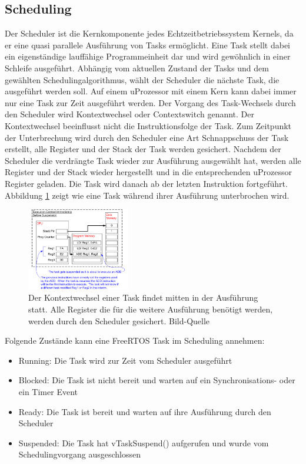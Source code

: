\subsection{Scheduling}
\label{Scheduling}
Der Scheduler ist die Kernkomponente jedes Echtzeitbetriebssystem Kernels, da er eine quasi parallele Aus\-füh\-rung von Tasks ermöglicht. Eine Task stellt dabei ein ei\-gen\-stän\-di\-ge lauffähige Programmeinheit dar und wird ge\-wöhn\-lich in einer Schleife ausgeführt. Abhängig vom aktuellen Zustand der Tasks und dem gewählten Schedulingalgorithmus, wählt der Scheduler die nächste Task, die ausgeführt werden soll. Auf einem uProzessor mit einem Kern kann dabei immer nur eine Task zur Zeit ausgeführt werden. Der Vorgang des Task-Wechsels durch den Scheduler wird Kontextwechsel oder Contextswitch genannt. Der Kontextwechsel beeinflusst nicht die Instruktionsfolge der Task. Zum Zeitpunkt der Unterbrechung wird durch den Scheduler eine Art Schnappschuss der Task erstellt, alle Register und der Stack der Task werden gesichert. Nachdem der Scheduler die verdrängte Task wieder zur Ausführung ausgewählt hat, werden alle Register und der Stack wieder hergestellt und in die entsprechenden uProzessor Register geladen. Die Task wird danach ab der letzten Instruktion fortgeführt. Abbildung \ref{fig:ContextSwitch} zeigt wie eine Task während ihrer Ausführung unterbrochen wird.
\begin{figure}[ht!]
	\centering
		\includegraphics[width=0.4\textwidth]{Pictures/FreeRTOSOrg/ExeContext.png}
	\caption{Der Kontextwechsel einer Task findet mitten in der Ausführung statt. Alle Register die für die weitere Ausführung benötigt werden, werden durch den Scheduler gesichert. Bild-Quelle~\protect{} }
	\label{fig:ContextSwitch}
\end{figure}
\newline   
Folgende Zu\-stän\-de kann eine FreeRTOS Task im Scheduling annehmen: 
\begin{itemize}
	\item Running: Die Task wird zur Zeit vom Scheduler ausgeführt
	\item Blocked: Die Task ist nicht bereit und warten auf ein Synchronisations- oder ein Timer Event
	\item Ready: Die Task ist bereit und warten auf ihre Aus\-füh\-rung durch den Scheduler
	\item Suspended: Die Task hat vTaskSuspend() aufgerufen und wurde vom Schedulingvorgang ausgeschlossen
\end{itemize}
